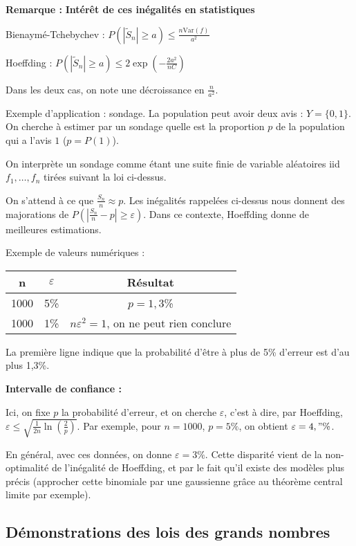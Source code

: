 \documentclass[10pt,a4paper,notitlepage ]{report}
\newcommand{\1}{\mathds 1}
\newcommand{\eps}{\varepsilon}
\newcommand{\var}{\mathrm{Var}}
\newcounter{th}
\newenvironment{rem}{
	
		\textbf{Remarque :}}{}
\begin{document}
\begin{rem}
	\textbf{Intérêt de ces inégalités en statistiques}
	
	Bienaymé-Tchebychev : $P(|\tilde S_n| \ge a) \le \frac{n\var(f)}{a^2}$
	
	Hoeffding : $P(|\tilde S_n| \ge a) \le 2\exp(-\frac{2a^2}{nC})$
	
	Dans les deux cas, on note une décroissance en $\frac n {a^2}$.

	Exemple d'application : sondage. La population peut avoir deux avis : $Y = \{ 0, 1\}$. On cherche à estimer par un sondage quelle est la proportion $p$ de la population qui a l'avis $1$ ($p=P(1)$).
	
	On interprète un sondage comme étant une suite finie de variable aléatoires iid $f_1, \dots, f_n$ tirées suivant la loi ci-dessus.
	
	On s'attend à ce que $\frac {S_n} n \approx p$. Les inégalités rappelées ci-dessus nous donnent des majorations de $P\left(\left|\frac{S_n} n - p \right| \ge \eps \right)$. Dans ce contexte, Hoeffding donne de meilleures estimations.
	
	Exemple de valeurs numériques :
	\begin{center}
		\begin{tabular}{|c|c||c|}
			\hline
			n & $\eps$ & Résultat \\
			\hline
			1000 & 5\% & $p=1,3$\% \\
			\hline
			1000 & 1\% & $n\eps^2 =1$, on ne peut rien conclure \\
			\hline
		\end{tabular}
	\end{center}

	La première ligne indique que la probabilité d'être à plus de 5\% d'erreur est d'au plus 1,3\%.
	
	\textbf{Intervalle de confiance :}
	
	Ici, on fixe $p$ la probabilité d'erreur, et on cherche $\eps$, c'est à dire, par Hoeffding, $\eps \le \sqrt{\frac 1 {2n} \ln\left(\frac 2 p \right)}$. Par exemple, pour $n=1000$, $p=5\%$, on obtient $\eps=4,"\%$.
	
	En général, avec ces données, on donne $\eps = 3\%$. Cette disparité vient de la non-optimalité de l'inégalité de Hoeffding, et par le fait qu'il existe des modèles plus précis (approcher cette binomiale par une gaussienne grâce au théorème central limite par exemple).
\end{rem}

\subsection{Démonstrations des lois des grands nombres}
\end{document}
